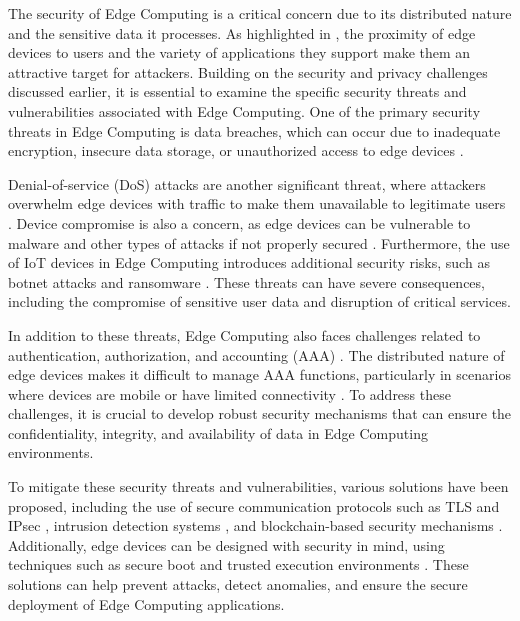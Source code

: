 \documentclass[11pt,a4paper]{article}
\begin{document}
The security of Edge Computing is a critical concern due to its distributed nature and the sensitive data it processes. As highlighted in \cite{arxiv:1602.00484}, the proximity of edge devices to users and the variety of applications they support make them an attractive target for attackers. Building on the security and privacy challenges discussed earlier, it is essential to examine the specific security threats and vulnerabilities associated with Edge Computing. One of the primary security threats in Edge Computing is data breaches, which can occur due to inadequate encryption, insecure data storage, or unauthorized access to edge devices \cite{arxiv:1807.00976}. 

Denial-of-service (DoS) attacks are another significant threat, where attackers overwhelm edge devices with traffic to make them unavailable to legitimate users \cite{arxiv:1808.05283}. Device compromise is also a concern, as edge devices can be vulnerable to malware and other types of attacks if not properly secured \cite{arxiv:2004.07311}. Furthermore, the use of IoT devices in Edge Computing introduces additional security risks, such as botnet attacks and ransomware \cite{arxiv:2407.17314}. These threats can have severe consequences, including the compromise of sensitive user data and disruption of critical services.

In addition to these threats, Edge Computing also faces challenges related to authentication, authorization, and accounting (AAA) \cite{arxiv:2101.07930}. The distributed nature of edge devices makes it difficult to manage AAA functions, particularly in scenarios where devices are mobile or have limited connectivity \cite{arxiv:1904.10125}. To address these challenges, it is crucial to develop robust security mechanisms that can ensure the confidentiality, integrity, and availability of data in Edge Computing environments.

To mitigate these security threats and vulnerabilities, various solutions have been proposed, including the use of secure communication protocols such as TLS and IPsec \cite{arxiv:2107.13374}, intrusion detection systems \cite{arxiv:2206.07164}, and blockchain-based security mechanisms \cite{arxiv:2105.03559}. Additionally, edge devices can be designed with security in mind, using techniques such as secure boot and trusted execution environments \cite{arxiv:2106.10063}. These solutions can help prevent attacks, detect anomalies, and ensure the secure deployment of Edge Computing applications.
\end{document}
